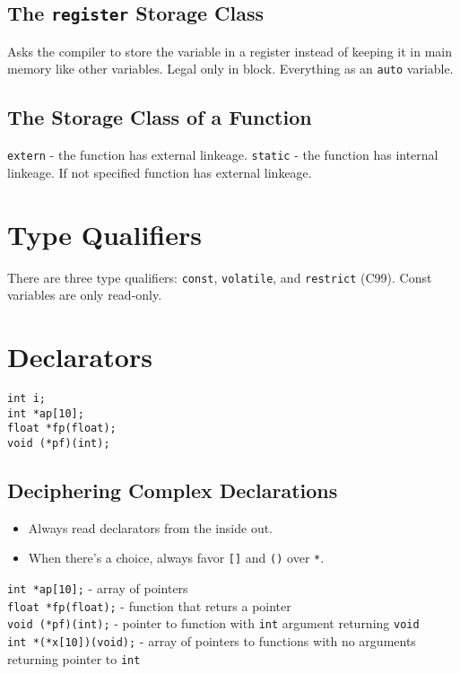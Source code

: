 \documentclass[openany]{book}
\begin{document}
    \subsection*{The \texttt{register} Storage Class}
    Asks the compiler to store the variable in a register instead of keeping it in main memory like other variables. Legal only in block. Everything as an \texttt{auto} variable.

    \subsection*{The Storage Class of a Function}
    \texttt{extern} - the function has external linkeage. \texttt{static} - the function has internal linkeage. If not specified function has external linkeage.

    \section{Type Qualifiers}
    There are three type qualifiers: \texttt{const}, \texttt{volatile}, and \texttt{restrict} (C99). Const variables are only read-only. 

    \section{Declarators}
    \texttt{int i; \\
    int *ap[10]; \\
    float *fp(float); \\
    void (*pf)(int);}

    \subsection*{Deciphering Complex Declarations}
    \begin{itemize}
        \item Always read declarators from the inside out.
        \item When there's a choice, always favor \texttt{[]} and \texttt{()} over \texttt{*}.
    \end{itemize}

    \texttt{int *ap[10];} - array of pointers \\
    \texttt{float *fp(float);} - function that returs a pointer \\
    \texttt{void (*pf)(int);} - pointer to function with \texttt{int} argument returning \texttt{void} \\
    \texttt{int *(*x[10])(void);} - array of pointers to functions with no arguments returning pointer to \texttt{int}
\end{document}
